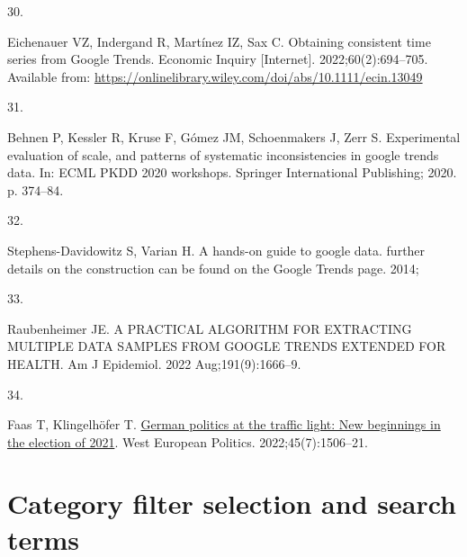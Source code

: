\documentclass[
  letterpaper,
  DIV=11,
  numbers=noendperiod]{scrartcl}
\newlength{\cslhangindent}
\newlength{\csllabelwidth}
\newlength{\cslentryspacingunit} %
\newenvironment{CSLReferences}[2] %
 {%
  \setlength{\parindent}{0pt}
  \ifodd #1
  \let\oldpar\par
  \def\par{\hangindent=\cslhangindent\oldpar}
  \fi
  \setlength{\parskip}{#2\cslentryspacingunit}
 }%
 {}
\newcommand{\CSLLeftMargin}[1]{\parbox[t]{\csllabelwidth}{#1}}
\newcommand{\CSLRightInline}[1]{\parbox[t]{\linewidth - \csllabelwidth}{#1}\break}
\newcommand{\beginsupplement}{\setcounter{section}{0} \renewcommand{\thesection}{A\arabic{section}}  \setcounter{table}{0}  \renewcommand{\thetable}{A\arabic{table}} \setcounter{figure}{0} \renewcommand{\thefigure}{A\arabic{figure}}}
\begin{document}
\begin{CSLReferences}{0}{0}
\leavevmode{}%
\CSLLeftMargin{30. }%
\CSLRightInline{Eichenauer VZ, Indergand R, Martínez IZ, Sax C.
Obtaining consistent time series from {Google} {Trends}. Economic
Inquiry {[}Internet{]}. 2022;60(2):694--705. Available from:
\url{https://onlinelibrary.wiley.com/doi/abs/10.1111/ecin.13049}}

\leavevmode{}%
\CSLLeftMargin{31. }%
\CSLRightInline{Behnen P, Kessler R, Kruse F, Gómez JM, Schoenmakers J,
Zerr S. Experimental evaluation of scale, and patterns of systematic
inconsistencies in google trends data. In: {ECML} {PKDD} 2020 workshops.
Springer International Publishing; 2020. p. 374--84. }

\leavevmode{}%
\CSLLeftMargin{32. }%
\CSLRightInline{Stephens-Davidowitz S, Varian H. A hands-on guide to
google data. further details on the construction can be found on the
Google Trends page. 2014; }

\leavevmode{}%
\CSLLeftMargin{33. }%
\CSLRightInline{Raubenheimer JE. A {PRACTICAL} {ALGORITHM} {FOR}
{EXTRACTING} {MULTIPLE} {DATA} {SAMPLES} {FROM} {GOOGLE} {TRENDS}
{EXTENDED} {FOR} {HEALTH}. Am J Epidemiol. 2022 Aug;191(9):1666--9. }

\leavevmode{}%
\CSLLeftMargin{34. }%
\CSLRightInline{Faas T, Klingelhöfer T.
\href{https://doi.org/10.1080/01402382.2022.2045783}{German politics at
the traffic light: New beginnings in the election of 2021}. West
European Politics. 2022;45(7):1506--21. }

\end{CSLReferences}

\newpage

\textbf{}

\beginsupplement

\hypertarget{sec-categoryfilterselection}{%
\section{Category filter selection and search
terms}\label{sec-categoryfilterselection}}
\end{document}
